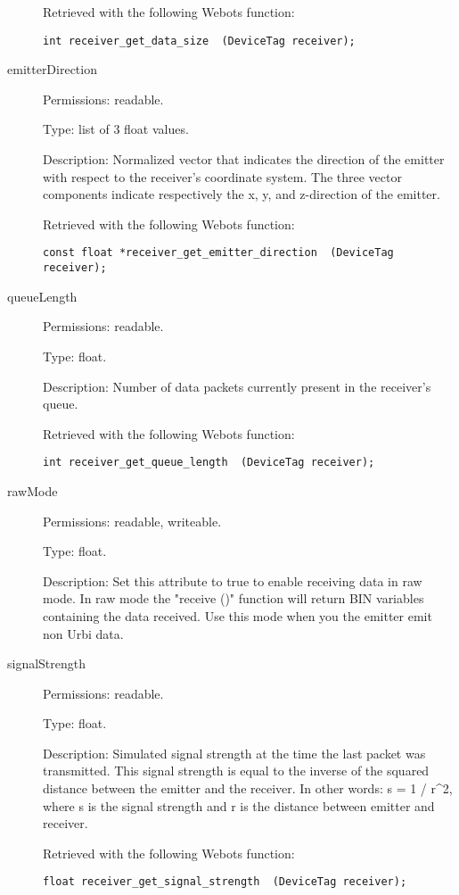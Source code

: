 \begin{description}
          Retrieved with the following Webots function:


\begin{lstlisting}
int receiver_get_data_size  (DeviceTag receiver);
\end{lstlisting}
\item[{         emitterDirection
 }]            Permissions: readable.


 Type: list of 3 float values.


 Description: Normalized vector that indicates the direction of the
 emitter with respect to the receiver's coordinate system. The three
 vector components indicate respectively the x, y, and z-{}direction
 of the emitter.


          Retrieved with the following Webots function:


\begin{lstlisting}
const float *receiver_get_emitter_direction  (DeviceTag receiver);
\end{lstlisting}
\item[{         queueLength
 }]            Permissions: readable.


 Type: float.


 Description: Number of data packets currently present in the
 receiver's queue.


          Retrieved with the following Webots function:


\begin{lstlisting}
int receiver_get_queue_length  (DeviceTag receiver);
\end{lstlisting}
\item[{         rawMode
 }]            Permissions: readable, writeable.


 Type: float.


 Description: Set this attribute to true to enable receiving data in
 raw mode.  In raw mode the "receive ()" function will return BIN
 variables containing the data received. Use this mode when you the
 emitter emit non Urbi data.

\item[{         signalStrength
 }]            Permissions: readable.


 Type: float.


 Description: Simulated signal strength at the time the last packet
 was transmitted.  This signal strength is equal to the inverse of the
 squared distance between the emitter and the receiver. In other
 words: s = 1 / r\^{}2, where s is the signal strength and r is the
 distance between emitter and receiver.


          Retrieved with the following Webots function:


\begin{lstlisting}
float receiver_get_signal_strength  (DeviceTag receiver);
\end{lstlisting}
\end{description}

